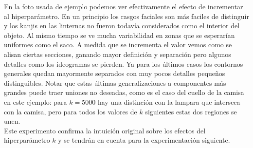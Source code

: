 \begin{figure}[H]
\begin{center}
	\hspace{1mm}
	\hspace{1mm}
	\caption{}
	\end{center}
	\label{costo_teo}
\end{figure}
\vspace{-7mm} 

\indent En la foto usada de ejemplo podemos ver efectivamente el efecto de incrementar al hiperparámetro. En un principio los rasgos faciales son m\'as faciles de distinguir y los kanjis en las linternas no fueron todav\'ia considerados como el interior del objeto. Al mismo tiempo se ve mucha variabilidad en zonas que se esperar\'ian uniformes como el saco. A medida que se incrementa el valor vemos como se alisan ciertas secciones, ganando mayor definici\'on y separaci\'on pero algunos detalles como los ideogramas se pierden. Ya para los últimos casos los contornos generales quedan mayormente separados con muy pocos detalles peque\~nos distinguibles. Notar que estas últimas generalizaciones a componentes m\'as grandes puede traer uniones no deseadas, como es el caso del cuello de la camisa en este ejemplo: para $k=5000$ hay una distinci\'on con la lampara que interseca con la camisa, pero para todos los valores de $k$ siguientes estas dos regiones se unen.\\
\indent Este experimento confirma la intuici\'on original sobre los efectos del hiperparámetro $k$ y se tendrán en cuenta para la experimentaci\'on siguiente.


